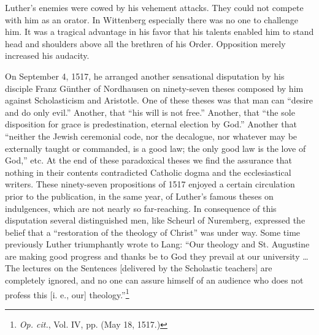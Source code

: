 Luther’s enemies were cowed by his vehement attacks. They could not
compete with him as an orator. In Wittenberg especially there was no one
to challenge him. It was a tragical advantage in his favor that his talents
enabled him to stand head and shoulders above all the brethren of his Order.
Opposition merely increased his audacity.

On September 4, 1517, he arranged another sensational disputation
by his disciple Franz Günther of Nordhausen on ninety-seven
theses composed by him against Scholasticism and Aristotle. One
of these theses was that man can “desire and do only evil.” Another,
that “his will is not free.” Another, that “the sole disposition for
grace is predestination, eternal election by God.” Another that
“neither the Jewish ceremonial code, nor the decalogue, nor whatever
may be externally taught or commanded, is a good law; the
only good law is the love of God,” etc. At the end of these paradoxical
theses we find the assurance that nothing in their contents
contradicted Catholic dogma and the ecclesiastical writers. These
ninety-seven propositions of 1517 enjoyed a certain circulation prior
to the publication, in the same year, of Luther’s famous theses on
indulgences, which are not nearly so far-reaching. In consequence
of this disputation several distinguished men, like Scheurl of Nuremberg,
expressed the belief that a “restoration of the theology of
Christ” was under way. Some time previously Luther triumphantly
wrote to Lang: “Our theology and St. Augustine are making good
progress and thanks be to God they prevail at our university \dots The
lectures on the Sentences [delivered by the Scholastic teachers] are
completely ignored, and no one can assure himself of an audience
who does not profess this [i. e., our] theology.”\footnote{\textit{Op. cit.}, Vol. IV, pp. (May 18, 1517.)}

